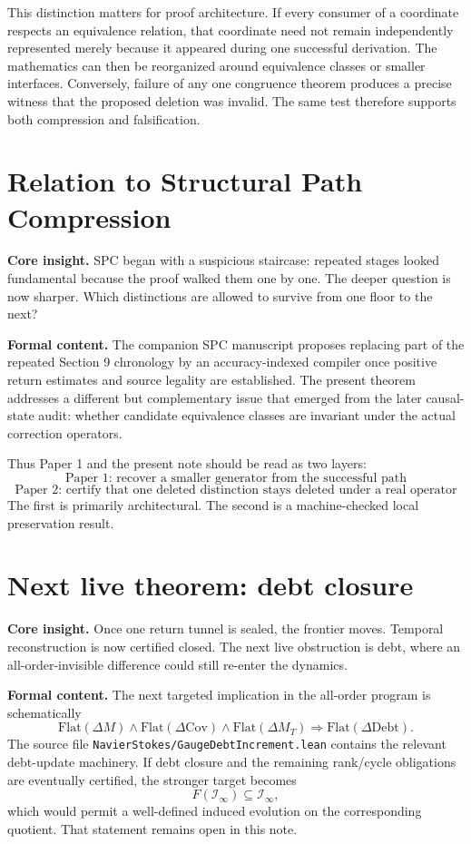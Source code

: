 \documentclass[11pt]{article}
\theoremstyle{highend}
\theoremstyle{definition}
\newcommand{\Flat}{\mathrm{Flat}}
\newcommand{\Iinf}{\mathcal I_{\infty}}
\begin{document}
This distinction matters for proof architecture. If every consumer of a coordinate respects an equivalence relation, that coordinate need not remain independently represented merely because it appeared during one successful derivation. The mathematics can then be reorganized around equivalence classes or smaller interfaces. Conversely, failure of any one congruence theorem produces a precise witness that the proposed deletion was invalid. The same test therefore supports both compression and falsification.

\section{Relation to Structural Path Compression}
\begin{eurekabox}
\textbf{Core insight.} SPC began with a suspicious staircase: repeated stages looked fundamental because the proof walked them one by one. The deeper question is now sharper. Which distinctions are allowed to survive from one floor to the next?
\end{eurekabox}
\noindent\textbf{Formal content.}
The companion SPC manuscript proposes replacing part of the repeated Section 9 chronology by an accuracy-indexed compiler once positive return estimates and source legality are established. The present theorem addresses a different but complementary issue that emerged from the later causal-state audit: whether candidate equivalence classes are invariant under the actual correction operators.

Thus Paper 1 and the present note should be read as two layers:
\[
\boxed{\text{Paper 1: recover a smaller generator from the successful path}}
\]
\[
\boxed{\text{Paper 2: certify that one deleted distinction stays deleted under a real operator}}
\]
The first is primarily architectural. The second is a machine-checked local preservation result.

\section{Next live theorem: debt closure}
\begin{eurekabox}
\textbf{Core insight.} Once one return tunnel is sealed, the frontier moves. Temporal reconstruction is now certified closed. The next live obstruction is debt, where an all-order-invisible difference could still re-enter the dynamics.
\end{eurekabox}
\noindent\textbf{Formal content.}
The next targeted implication in the all-order program is schematically
\[
\Flat(\Delta M)\wedge \Flat(\Delta \mathrm{Cov})\wedge \Flat(\Delta M_T)
\Longrightarrow
\Flat(\Delta \mathrm{Debt}).
\]
The source file \texttt{NavierStokes/GaugeDebtIncrement.lean} contains the relevant debt-update machinery. If debt closure and the remaining rank/cycle obligations are eventually certified, the stronger target becomes
\[
F(\Iinf)\subseteq\Iinf,
\]
which would permit a well-defined induced evolution on the corresponding quotient. That statement remains open in this note.
\end{document}
